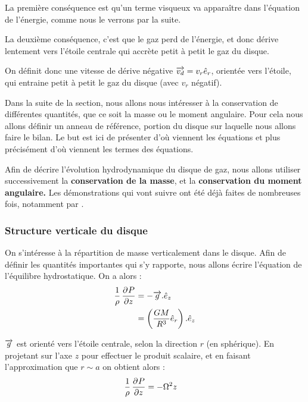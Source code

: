 \bigskip

La première conséquence est qu'un terme visqueux va apparaître dans l'équation de l'énergie, comme nous le verrons par la suite. 

La deuxième conséquence, c'est que le gaz perd de l'énergie, et donc dérive lentement vers l'étoile centrale qui accrète petit à petit le gaz du disque. 

On définit donc une vitesse de dérive négative ${\overrightarrow{v_d}} = v_r \hat{e}_r$, orientée vers l'étoile, qui entraine petit à petit le gaz du disque (avec $v_r$ négatif).

Dans la suite de la section, nous allons nous intéresser à la conservation de différentes quantités, que ce soit la masse ou le moment angulaire. Pour cela nous allons définir un anneau de référence, portion du disque sur laquelle nous allons faire le bilan. Le but est ici de présenter d'où viennent les équations et plus précisément d'où viennent les termes des équations. 

\bigskip

Afin de décrire l'évolution hydrodynamique du disque de gaz, nous allons utiliser successivement la \textbf{conservation de la masse}, et la \textbf{conservation du moment angulaire.} Les démonstrations qui vont suivre ont été déjà faites de nombreuses fois, notamment par \citep{pringle1981accretion}. %

\subsubsection{Structure verticale du disque}
On s'intéresse à la répartition de masse verticalement dans le disque. Afin de définir les quantités importantes qui s'y rapporte, nous allons écrire l'équation de l'équilibre hydrostatique. On a alors :
\begin{align}
\frac{1}{\rho}\mathinner{ \dfrac{\partial{^{}}P}{\partial{{z}^{}}} } &= - {\overrightarrow{g}}.\hat{e}_z\\
&= \left(\frac{GM}{R^3}\hat{e}_r\right).\hat{e}_z
\end{align}

${\overrightarrow{g}}$ est orienté vers l'étoile centrale, selon la direction $r$ (en sphérique). En projetant sur l'axe $z$ pour effectuer le produit scalaire, et en faisant l'approximation que $r\sim a$ on obtient alors :
\begin{align}
\frac{1}{\rho}\mathinner{ \dfrac{\partial{^{}}P}{\partial{{z}^{}}} } &= -\Omega^2 z
\end{align}

